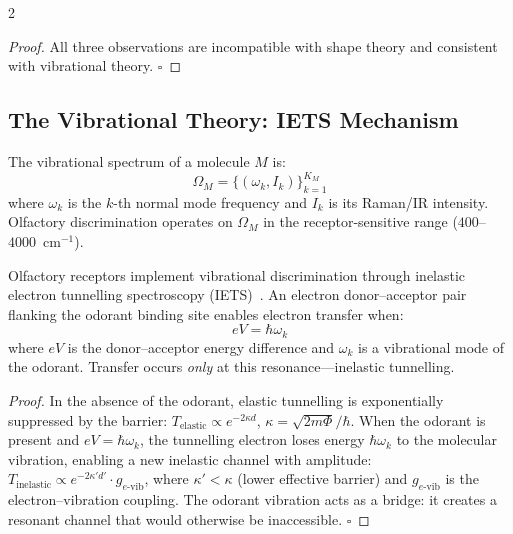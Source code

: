 \begin{multicols}{2}
\begin{proof}
All three observations are incompatible with shape theory and consistent with
vibrational theory. $\square$
\end{proof}

\subsection{The Vibrational Theory: IETS Mechanism}
\label{ssec:vibrational}

\begin{definition}
\label{def:vib_spectrum}
The vibrational spectrum of a molecule $M$ is:
\begin{equation}
\Omega_M = \{(\omega_k, I_k)\}_{k=1}^{K_M}
\end{equation}
where $\omega_k$ is the $k$-th normal mode frequency and $I_k$ is its
Raman/IR intensity.  Olfactory discrimination operates on $\Omega_M$ in
the receptor-sensitive range ($400$--$4000$~cm$^{-1}$).
\end{definition}

\begin{theorem}
\label{thm:iets}
Olfactory receptors implement vibrational discrimination through inelastic
electron tunnelling spectroscopy (IETS)~\citep{turin1996spectroscopic}.
An electron donor--acceptor pair flanking the odorant binding site enables
electron transfer when:
\begin{equation}
eV = \hbar\omega_k
\label{eq:iets_resonance}
\end{equation}
where $eV$ is the donor--acceptor energy difference and $\omega_k$ is
a vibrational mode of the odorant.  Transfer occurs \emph{only} at this
resonance---inelastic tunnelling.
\end{theorem}

\begin{proof}
In the absence of the odorant, elastic tunnelling is exponentially
suppressed by the barrier:
$T_{\text{elastic}} \propto e^{-2\kappa d}$,
$\kappa = \sqrt{2m\Phi}/\hbar$.
When the odorant is present and $eV = \hbar\omega_k$, the tunnelling
electron loses energy $\hbar\omega_k$ to the molecular vibration,
enabling a new inelastic channel with amplitude:
$T_{\text{inelastic}} \propto e^{-2\kappa' d'}\cdot g_{e\text{-vib}}$,
where $\kappa' < \kappa$ (lower effective barrier) and
$g_{e\text{-vib}}$ is the electron--vibration coupling.  The odorant
vibration acts as a bridge: it creates a resonant channel that would
otherwise be inaccessible. $\square$
\end{proof}


\end{multicols}
